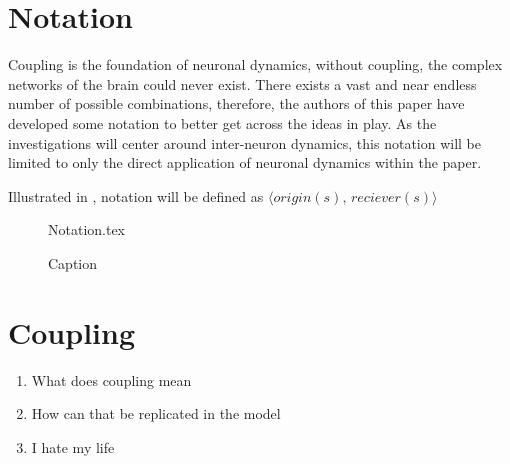 \documentclass[class={myRUCProject}, crop=false]{standalone}
\begin{document}
\section{Notation}


Coupling is the foundation of neuronal dynamics, without coupling, the complex networks of the brain could never exist. There exists a vast and near endless number of possible combinations, therefore, the authors of this paper have developed some notation to better get across the ideas in play.
As the investigations will center around inter-neuron dynamics, this notation will be limited to only the direct application of neuronal dynamics within the paper.

Illustrated in , notation will be defined as \(\langle origin(s), \, reciever(s)\rangle\)
\begin{figure}[h]
    \centering
    {Notation.tex}
    \caption{Caption}\label{fig:notation}
\end{figure}


\section{Coupling}



\begin{enumerate}
    \item What does coupling mean
    \item How can that be replicated in the model
    \item I hate my life
\end{enumerate}





\end{document}
